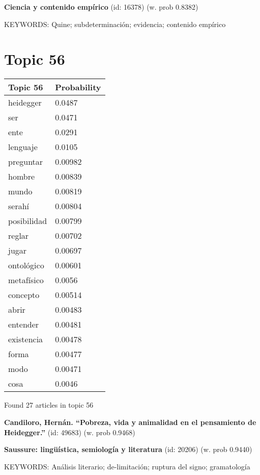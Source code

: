 \documentclass{article}
\begin{document}
\textbf{Ciencia y contenido empírico} (id: 16378)
 (w. prob 0.8382)


KEYWORDS:
Quine; subdeterminación; evidencia; contenido empírico

\vfill
\newpage


\centering
\thispagestyle{empty}
\section*{Topic 56}\vfill
\begin{tabular}{ll}
\toprule
    Topic 56 & Probability \\
\midrule
   heidegger &      0.0487 \\
         ser &      0.0471 \\
        ente &      0.0291 \\
    lenguaje &      0.0105 \\
   preguntar &     0.00982 \\
      hombre &     0.00839 \\
       mundo &     0.00819 \\
      serahí &     0.00804 \\
 posibilidad &     0.00799 \\
      reglar &     0.00702 \\
       jugar &     0.00697 \\
  ontológico &     0.00601 \\
  metafísico &      0.0056 \\
    concepto &     0.00514 \\
       abrir &     0.00483 \\
    entender &     0.00481 \\
  existencia &     0.00478 \\
       forma &     0.00477 \\
        modo &     0.00471 \\
        cosa &      0.0046 \\
\bottomrule
\end{tabular}

\vfill
Found 27 articles in topic 56
\vfill

\textbf{Candiloro, Hernán. “Pobreza, vida y animalidad en el pensamiento de Heidegger.”} (id: 49683)
 (w. prob 0.9468)
\vfill

\textbf{Saussure: lingüística, semiología y literatura} (id: 20206)
 (w. prob 0.9440)


KEYWORDS:
Análisis literario; de-limitación; ruptura del signo; gramatología
\vfill
\end{document}

